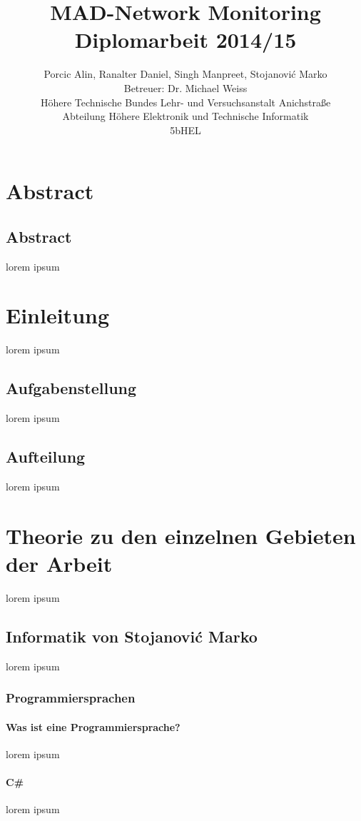 \documentclass[12pt,a4paper]{report}
\title{MAD-Network Monitoring\\
Diplomarbeit 2014/15}
\author{Porcic Alin, Ranalter Daniel, Singh Manpreet, Stojanovi\'{c} Marko\\
Betreuer: Dr. Michael Weiss\\
Höhere Technische Bundes Lehr- und Versuchsanstalt Anichstraße\\
Abteilung Höhere Elektronik und Technische Informatik\\
5bHEL}
\begin{document}
\maketitle
\newpage

\tableofcontents
\newpage

\pagestyle{fancy}
\part{Abstract}
\chapter{Abstract}
\thispagestyle{fancy}

lorem ipsum

\part{Einleitung}
\thispagestyle{fancy}

lorem ipsum

\chapter{Aufgabenstellung}
lorem ipsum

\chapter{Aufteilung}
lorem ipsum 

\part{Theorie zu den einzelnen Gebieten der Arbeit}
lorem ipsum
\chapter{Informatik von Stojanovi\'{c} Marko}
lorem ipsum

\section{Programmiersprachen}

\subsection{Was ist eine Programmiersprache?}
lorem ipsum
\subsection{C\#}
lorem ipsum
\end{document}
